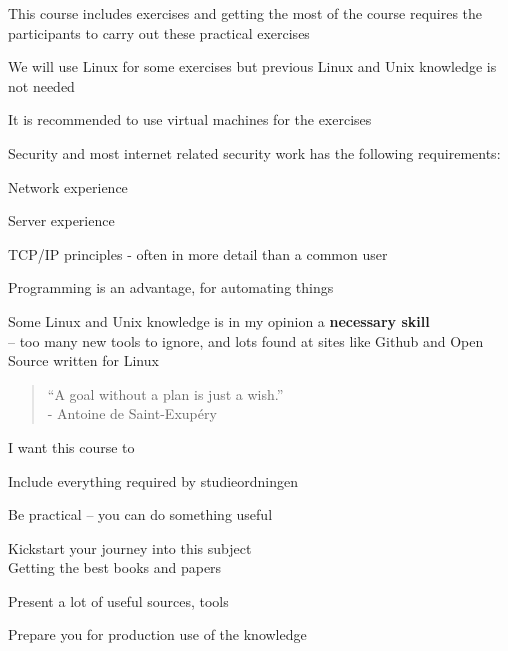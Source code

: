 \documentclass[Screen16to9,17pt]{foils}
\begin{document}
\begin{list1}
\item This course includes exercises and getting the most of the course requires the participants to carry out these practical exercises
\item We will use Linux for some exercises but previous Linux and Unix knowledge is not needed
\item It is recommended to use virtual machines for the exercises
\item Security and most internet related security work has the following requirements:
\begin{list2}
\item Network experience
\item Server experience
\item TCP/IP principles - often in more detail than a common user
\item Programming is an advantage, for automating things
\item Some Linux and Unix knowledge is in my opinion a {\bf necessary skill}\\
-- too many new tools to ignore, and lots found at sites like Github and Open Source written for Linux
\end{list2}
\end{list1}





\begin{quote}
  “A goal without a plan is just a wish.”\\
  - Antoine de Saint-Exupéry
\end{quote}

I want this course to
\begin{list2}
\item Include everything required by studieordningen
\item Be practical -- you can do something useful
\item Kickstart your journey into this subject\\
Getting the best books and papers
\item Present a lot of useful sources, tools
\item Prepare you for production use of the knowledge
\end{list2}



\end{document}

